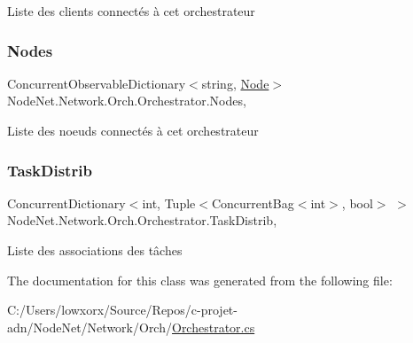 Liste des clients connectés à cet orchestrateur 

\mbox{\label{class_node_net_1_1_network_1_1_orch_1_1_orchestrator_a8463f3979de7558db4c99d649bafe982}} 
\subsubsection{\texorpdfstring{Nodes}{Nodes}}
{\footnotesize\ttfamily Concurrent\+Observable\+Dictionary$<$string, \hyperlink{class_node_net_1_1_network_1_1_nodes_1_1_node}{Node}$>$ Node\+Net.\+Network.\+Orch.\+Orchestrator.\+Nodes\hspace{0.3cm}{\ttfamily [get]}, {\ttfamily [set]}}



Liste des noeuds connectés à cet orchestrateur 

\mbox{\label{class_node_net_1_1_network_1_1_orch_1_1_orchestrator_a22f5c037662ffdf87f7ec1f0165606f7}} 
\subsubsection{\texorpdfstring{Task\+Distrib}{TaskDistrib}}
{\footnotesize\ttfamily Concurrent\+Dictionary$<$int, Tuple$<$Concurrent\+Bag$<$int$>$, bool$>$ $>$ Node\+Net.\+Network.\+Orch.\+Orchestrator.\+Task\+Distrib\hspace{0.3cm}{\ttfamily [get]}, {\ttfamily [set]}}



Liste des associations des tâches 



The documentation for this class was generated from the following file\+:\begin{DoxyCompactItemize}
\item 
C\+:/\+Users/lowxorx/\+Source/\+Repos/c-\/projet-\/adn/\+Node\+Net/\+Network/\+Orch/\hyperlink{_orchestrator_8cs}{Orchestrator.\+cs}\end{DoxyCompactItemize}
